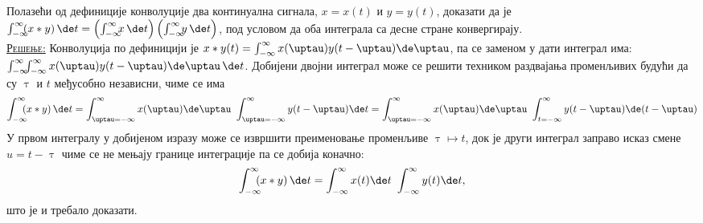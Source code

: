 \PID 
Полазећи од дефиниције 
конволуције два континуална сигнала, $x = x(t)$ и 
$y = y(t)$, доказати да је 
$\int_{-\infty}^{\infty} \hspace*{-0.5em} 
(x \ast y) \, \de t = 
\left( \int_{-\infty}^{\infty} \hspace*{-0.5em}
x \, \de  t \right)
\left( \int_{-\infty}^{\infty} \hspace*{-0.5em}
 y \, \de t \right)$, 
 под условом да оба интеграла
 са десне стране конвергирају.
\\[2mm]

\textsc{\underline{Решење:}} Конволуција по дефиницији је 
$x\ast y (t)  = \int_{-\infty}^{\infty} x(\uptau) y(t-\uptau) \de \uptau$, па 
се заменом у дати интеграл има:
$
    \int_{-\infty}^{\infty} \hspace*{-0.5em} 
    \int_{-\infty}^{\infty} x(\uptau) y(t-\uptau) \de \uptau \, \de t
$. Добијени двојни интеграл може се решити техником раздвајања променљивих 
будући да су $\uptau$ и $t$ међусобно независни, чиме се има 
\begin{equation}
    \int_{-\infty}^{\infty} \hspace*{-0.5em} 
    (x \ast y) \, \de t = 
    \int_{\uptau = -\infty}^{\infty} x(\uptau)  \de \uptau \ 
    \int_{\uptau = -\infty}^{\infty} y(t-\uptau) \de t 
    = 
    \int_{\uptau = -\infty}^{\infty} x(\uptau)  \de \uptau \ 
    \int_{t = -\infty}^{\infty} y(t-\uptau) \de ({t - \uptau})
\end{equation}
У првом интегралу у добијеном изразу може се извршити преименовање променљиве $\uptau \mapsto t$, док је други интеграл 
заправо исказ смене $u = t - \uptau$ чиме се не мењају границе интеграције па се добија коначно: 
\begin{equation}
    \int_{-\infty}^{\infty} \hspace*{-0.5em} 
    (x \ast y) \, \de t = 
    \int_{-\infty}^{\infty} x(t)  \de t \ 
    \int_{-\infty}^{\infty} y(t) \de t,
\end{equation}
што је и требало доказати.